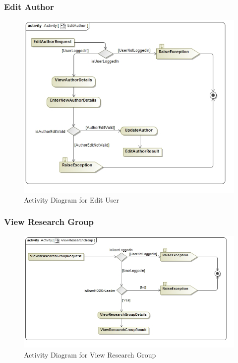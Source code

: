 \documentclass[a4paper,10pt]{article}
\begin{document}
	
\subsubsection{Edit Author}
	\begin{figure}[h]
		\includegraphics[scale=0.5]{ActEditAuthor}
		\caption{Activity Diagram for Edit User}
	\end{figure}

\subsubsection{View Research Group}
	\begin{figure}[h]
		\includegraphics[scale=0.5]{ActViewResearchGroup}
		\caption{Activity Diagram for View Research Group}
	\end{figure}
	
\end{document}

